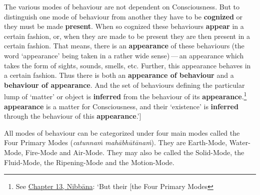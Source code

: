 The various modes of behaviour are not dependent on Consciousness. But to distinguish one mode of behaviour from another they have to be \textbf{cognized} or they must be made \textbf{present}. When so cognized these behaviours \textbf{appear} in a certain fashion, or, when they are made to be present they are then present in a certain fashion. That means, there is an \textbf{appearance} of these behaviours (the word `appearance' being taken in a rather wide sense) --- an appearance which takes the form of sights, sounds, smells, etc. Further, this appearance behaves in a certain fashion. Thus there is both an \textbf{appearance of behaviour} and a \textbf{behaviour of appearance}. And the set of behaviours defining the particular lump of `matter' or object is \textbf{inferred} from the behaviour of its \textbf{appearance}.\footnote{See \href{ch-13-nibbana.xml\#the-four-primary}{Chapter 13, Nibbāna}: `But their {[}the Four Primary Modes} \textbf{appearance} is a matter for Consciousness, and their `existence' is \textbf{inferred} through the behaviour of this \textbf{appearance}.'{]}

All modes of behaviour can be categorized under four main modes called the Four Primary Modes (\emph{catunnaṁ mahābhūtānaṁ}). They are Earth-Mode, Water-Mode, Fire-Mode and Air-Mode. They may also be called the Solid-Mode, the Fluid-Mode, the Ripening-Mode and the Motion-Mode.

